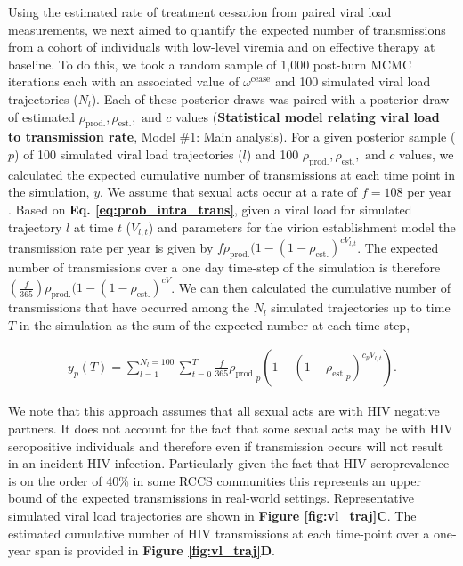\documentclass{article}[11pt]
\begin{document}
Using the estimated rate of treatment cessation from paired viral load measurements, we next aimed to quantify the expected number of transmissions from a cohort of individuals with low-level viremia and on effective therapy at baseline. To do this, we took a random sample of 1,000 post-burn MCMC iterations each with an associated value of $\omega^\text{cease}$ and 100 simulated viral load trajectories ($N_l$). Each of these posterior draws was paired with a posterior draw of estimated $\rho_\text{prod.}, \rho_\text{est.},\text{ and } c$ values (\textbf{Statistical model relating viral load to transmission rate}, Model \#1: Main analysis). For a given posterior sample ($p$) of 100 simulated viral load trajectories ($l$) and 100 ${\rho_\text{prod.}}, \rho_\text{est.},\text{ and } c$ values, we calculated the expected cumulative number of transmissions at each time point in the simulation, $y$. We assume that sexual acts occur at a rate of $f = 108$ per year \cite{quinn2000}. Based on \textbf{Eq. \ref{eq:prob_intra_trans}}, given a viral load for simulated trajectory $l$ at time $t$ ($V_{l,t}$) and parameters for the virion establishment model the transmission rate per year is given by $f\rho_\text{prod.}(1 - (1 - \rho_\text{est.})^{cV_{l,t}}$. The expected number of transmissions over a one day time-step of the simulation is therefore $(\frac{f}{365})\rho_\text{prod.}(1 - (1 - \rho_\text{est.})^{cV}$. We can then calculated the cumulative number of transmissions that have occurred among the $N_l$ simulated trajectories up to time $T$ in the simulation as the sum of the expected number at each time step, 

\begin{align}
y_{p}(T) = \sum_{l=1}^{N_l = 100}\sum_{t=0}^T \frac{f}{365}{\rho_\text{prod.}}_p\left(1 - (1 - {\rho_\text{est.}}_p)^{c_pV_{l,t}}\right).
\end{align}

We note that this approach assumes that all sexual acts are with HIV negative partners. It does not account for the fact that some sexual acts may be with HIV seropositive individuals and therefore even if transmission occurs will not result in an incident HIV infection. Particularly given the fact that HIV seroprevalence is on the order of 40\% in some RCCS communities  this represents an upper bound of the expected transmissions in real-world settings. Representative simulated viral load trajectories are shown in \textbf{Figure \ref{fig:vl_traj}C}. The estimated cumulative number of HIV transmissions at each time-point over a one-year span is provided in \textbf{Figure \ref{fig:vl_traj}D}. 
\end{document}
